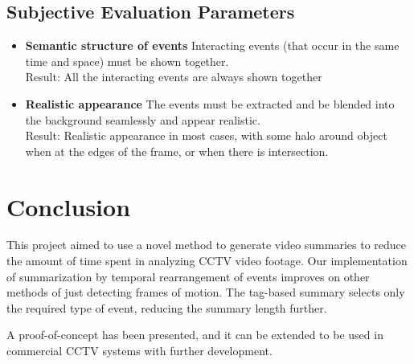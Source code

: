 \documentclass[conference]{IEEEtran}
\begin{document}
    \subsection{Subjective Evaluation Parameters}

    \begin{itemize}
        \item \textbf{Semantic structure of events}
        Interacting events (that occur in the same time and space) must be
        shown together. \\
        Result: All the interacting events are always shown together
        \item \textbf{Realistic appearance}
        The events must be extracted and be blended into the background
        seamlessly and appear realistic. \\
        Result: Realistic appearance in most cases, with some halo around
        object when at the edges of the frame, or when there is intersection.
    \end{itemize}

\section{Conclusion}
This project aimed to use a novel method to generate video summaries to reduce
the amount of time spent in analyzing CCTV video footage. Our implementation of
summarization by temporal rearrangement of events improves on other methods of
just detecting frames of motion. The tag-based summary selects only the required
type of event, reducing the summary length further.

A proof-of-concept has been presented, and it can be extended to be used in
commercial CCTV systems with further development.

\end{document}
